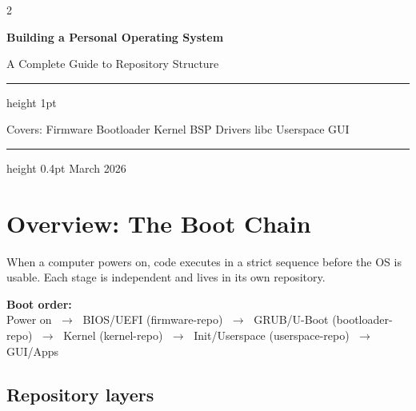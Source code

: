 2\documentclass[11pt,a4paper]{article}
\begin{document}
\begin{titlepage}
  \centering
  \vspace*{3cm}
  {\Huge\bfseries\color{sectioncolor} Building a Personal Operating System\par}
  \vspace{0.5cm}
  {\large\color{gray} A Complete Guide to Repository Structure\par}
  \vspace{2cm}
  \hrule height 1pt
  \vspace{0.5cm}
  {\normalsize\color{gray}
    Covers: Firmware \textbullet{} Bootloader \textbullet{} Kernel \textbullet{}
    BSP \textbullet{} Drivers \textbullet{} libc \textbullet{} Userspace \textbullet{} GUI
  \par}
  \vspace{0.5cm}
  \hrule height 0.4pt
  \vfill
  {\small\color{gray} March 2026}
\end{titlepage}

\tableofcontents
\newpage

\section{Overview: The Boot Chain}

When a computer powers on, code executes in a strict sequence before the OS is usable. Each stage is independent and lives in its own repository.

\begin{infobox}
\textbf{Boot order:}\\
Power on
$\;\rightarrow\;$ BIOS/UEFI (firmware-repo)
$\;\rightarrow\;$ GRUB/U-Boot (bootloader-repo)
$\;\rightarrow\;$ Kernel (kernel-repo)
$\;\rightarrow\;$ Init/Userspace (userspace-repo)
$\;\rightarrow\;$ GUI/Apps
\end{infobox}

\subsection*{Repository layers}
\end{document}
